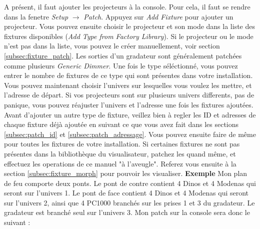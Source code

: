 A présent, il faut ajouter les projecteurs à la console. Pour cela, il faut se rendre dans la fenetre \textit{Setup} $\rightarrow$ \textit{Patch}.
\newline
Appuyez sur \textit{Add Fixture} pour ajouter un projecteur. Vous pouvez ensuite choisir le projecteur et son mode dans la liste des fixtures disponibles (\textit{Add Type from Factory Library}).
Si le projecteur ou le mode n'est pas dans la liste, vous pouvez le créer manuellement, voir section \ref{subsec:fixture_patch}.
\newline
Les sorties d'un gradateur sont généralement patchées comme plusieurs \textit{Generic Dimmer}.
\newline
\newline
Une fois le type séléctionné, vous pouvez entrer le nombre de fixtures de ce type qui sont présentes dans votre installation.
\newline
Vous pouvez maintenant choisir l'univers sur lesquelles vous voulez les mettre, et l'adresse de départ.
Si vos projecteurs sont sur plusieurs univers differents, pas de panique, vous pouvez réajuster l'univers et l'adresse une fois les fixtures ajoutées.
\newline
Avant d'ajouter un autre type de fixture, veillez bien à regler les ID et adresses de chaque fixture déjà ajoutée en suivant ce que vous avez fait dans les sections \ref{subsec:patch_id} et \ref{subsec:patch_adressage}.
\newline
Vous pouvez ensuite faire de même pour toutes les fixtures de votre installation.
\newline
\newline
Si certaines fixtures ne sont pas présentes dans la bibliothèque du visualisateur, patchez les quand même, et effectuez les operations de ce manuel "à l'aveugle".
Referez vous ensuite à la section \ref{subsec:fixture_morph} pour pouvoir les visualiser.
\newline
\newline
\textbf{Exemple}
\newline
\newline
Mon plan de feu comporte deux ponts. Le pont de contre contient 4 Dinos et 4 Modenas qui seront sur l'univers 1.
Le pont de face contient 4 Dinos et 4 Modenas qui seront sur l'univers 2, ainsi que 4 PC1000 branchés sur les prises 1 et 3 du gradateur.
Le gradateur est branché seul sur l'univers 3.
\newline
Mon patch sur la console sera donc le suivant :
